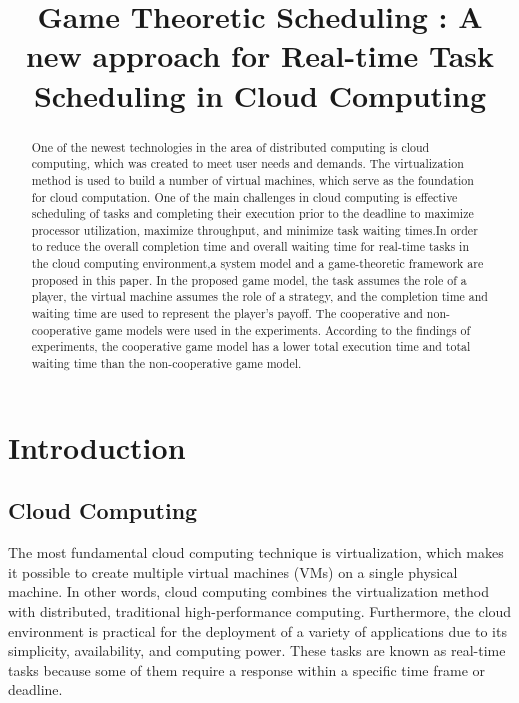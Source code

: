 \documentclass[conference]{IEEEtran}
\begin{document}
\title{Game Theoretic Scheduling : A new approach for Real-time Task Scheduling in Cloud Computing\\

}

\author{
}

\maketitle

\begin{abstract}
One of the newest technologies in the area of distributed computing is cloud computing, which was created to meet user needs and demands. The virtualization method is used to build a number of virtual machines, which serve as the foundation for cloud computation. One of the main challenges in cloud computing is effective scheduling of tasks and completing their execution prior to the deadline to maximize processor utilization, maximize throughput, and minimize task waiting times.In order to reduce the overall completion time and overall waiting time for real-time tasks in the cloud computing environment,a system model and a game-theoretic framework are proposed in this paper. In the proposed game model, the task assumes the role of a player, the virtual machine assumes the role of a strategy, and the completion time and waiting time are used to represent the player's payoff. The cooperative and non-cooperative game models were used in the experiments. According to the findings of experiments, the cooperative game model has a lower total execution time and total waiting time than the non-cooperative game model.\end{abstract}

\section{\textbf{Introduction}}
\subsection{Cloud Computing}
The most fundamental cloud computing technique is virtualization, which makes it possible to create multiple virtual machines (VMs) on a single physical machine. In other words, cloud computing combines the virtualization method with distributed, traditional high-performance computing. Furthermore, the cloud environment is practical for the deployment of a variety of applications due to its simplicity, availability, and computing power. These tasks are known as real-time tasks because some of them require a response within a specific time frame or deadline. 
\end{document}
